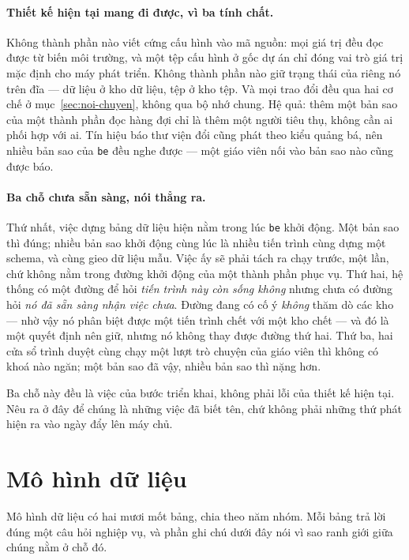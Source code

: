 \paragraph{Thiết kế hiện tại mang đi được, vì ba tính chất.} Không thành phần nào viết cứng
cấu hình vào mã nguồn: mọi giá trị đều đọc được từ biến môi trường, và một tệp cấu hình ở gốc dự
án chỉ đóng vai trò giá trị mặc định cho máy phát triển. Không thành phần nào giữ trạng thái của riêng nó
trên đĩa --- dữ liệu ở kho dữ liệu, tệp ở kho tệp. Và mọi trao đổi đều qua hai cơ chế ở
mục~\ref{sec:noi-chuyen}, không qua bộ nhớ chung. Hệ quả: thêm một bản sao của một thành phần đọc
hàng đợi chỉ là thêm một người tiêu thụ, không cần ai phối hợp với ai. Tín hiệu báo thư viện đổi
cũng phát theo kiểu quảng bá, nên nhiều bản sao của \texttt{be} đều nghe được --- một giáo viên
nối vào bản sao nào cũng được báo.

\paragraph{Ba chỗ chưa sẵn sàng, nói thẳng ra.} Thứ nhất, việc dựng bảng dữ liệu hiện nằm trong
lúc \texttt{be} khởi động. Một bản sao thì đúng; nhiều bản sao khởi động cùng lúc là nhiều tiến
trình cùng dựng một schema, và cùng gieo dữ liệu mẫu. Việc ấy sẽ phải tách ra chạy trước, một
lần, chứ không nằm trong đường khởi động của một thành phần phục vụ. Thứ hai, hệ thống có một
đường để hỏi \emph{tiến trình này còn sống không} nhưng chưa có đường hỏi \emph{nó đã sẵn sàng
nhận việc chưa}. Đường đang có cố ý \emph{không} thăm dò các kho --- nhờ vậy nó phân biệt được
một tiến trình chết với một kho chết --- và đó là một quyết định nên giữ, nhưng nó không thay
được đường thứ hai. Thứ ba, hai cửa sổ trình duyệt cùng chạy một lượt trò chuyện của giáo viên
thì không có khoá nào ngăn; một bản sao đã vậy, nhiều bản sao thì nặng hơn.

Ba chỗ này đều là việc của bước triển khai, không phải lỗi của thiết kế hiện tại. Nêu ra ở đây
để chúng là những việc đã biết tên, chứ không phải những thứ phát hiện ra vào ngày đẩy lên máy
chủ.

\section{Mô hình dữ liệu}

Mô hình dữ liệu có hai mươi mốt bảng, chia theo năm nhóm. Mỗi bảng trả lời đúng một câu hỏi
nghiệp vụ, và phần ghi chú dưới đây nói vì sao ranh giới giữa chúng nằm ở chỗ đó.

